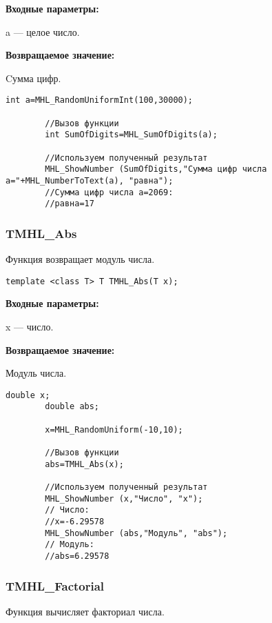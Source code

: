\documentclass[a4paper,12pt]{article}
\begin{document}
\textbf{Входные параметры:}

a --- целое число.

\textbf{Возвращаемое значение:}

Cумма цифр.


\begin{lstlisting}[label=code_use_MHL_SumOfDigits,caption=Пример использования]
        int a=MHL_RandomUniformInt(100,30000);

        //Вызов функции
        int SumOfDigits=MHL_SumOfDigits(a);

        //Используем полученный результат
        MHL_ShowNumber (SumOfDigits,"Сумма цифр числа a="+MHL_NumberToText(a), "равна");
        //Сумма цифр числа a=2069:
        //равна=17
\end{lstlisting}

\subsubsection{TMHL\_Abs}\label{TMHL_Abs}

Функция возвращает модуль числа.


\begin{lstlisting}[label=code_syntax_TMHL_Abs,caption=Синтаксис]
template <class T> T TMHL_Abs(T x);
\end{lstlisting}

\textbf{Входные параметры:}

 x --- число.
 
\textbf{Возвращаемое значение:}

 Модуль числа.


\begin{lstlisting}[label=code_use_TMHL_Abs,caption=Пример использования]
        double x;
        double abs;

        x=MHL_RandomUniform(-10,10);

        //Вызов функции
        abs=TMHL_Abs(x);

        //Используем полученный результат
        MHL_ShowNumber (x,"Число", "x");
        // Число:
        //x=-6.29578
        MHL_ShowNumber (abs,"Модуль", "abs");
        // Модуль:
        //abs=6.29578
\end{lstlisting}

\subsubsection{TMHL\_Factorial}\label{TMHL_Factorial}

Функция вычисляет факториал числа.
\end{document}
